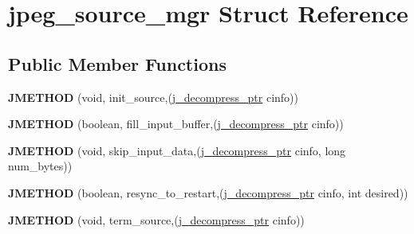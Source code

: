 \hypertarget{structjpeg__source__mgr}{\section{jpeg\+\_\+source\+\_\+mgr Struct Reference}
\label{structjpeg__source__mgr}
}
\subsection*{Public Member Functions}
\begin{DoxyCompactItemize}
\item 
\hypertarget{structjpeg__source__mgr_af8fda02c19c9dc4e505daabb77c3ad81}{{\bfseries J\+M\+E\+T\+H\+O\+D} (void, init\+\_\+source,(\hyperlink{structjpeg__decompress__struct}{j\+\_\+decompress\+\_\+ptr} cinfo))}\label{structjpeg__source__mgr_af8fda02c19c9dc4e505daabb77c3ad81}

\item 
\hypertarget{structjpeg__source__mgr_ab4a579b1f50108e2de73c7c0c1bbb9fd}{{\bfseries J\+M\+E\+T\+H\+O\+D} (boolean, fill\+\_\+input\+\_\+buffer,(\hyperlink{structjpeg__decompress__struct}{j\+\_\+decompress\+\_\+ptr} cinfo))}\label{structjpeg__source__mgr_ab4a579b1f50108e2de73c7c0c1bbb9fd}

\item 
\hypertarget{structjpeg__source__mgr_a3e29df8ddadb0c15e54b69b5a7a10305}{{\bfseries J\+M\+E\+T\+H\+O\+D} (void, skip\+\_\+input\+\_\+data,(\hyperlink{structjpeg__decompress__struct}{j\+\_\+decompress\+\_\+ptr} cinfo, long num\+\_\+bytes))}\label{structjpeg__source__mgr_a3e29df8ddadb0c15e54b69b5a7a10305}

\item 
\hypertarget{structjpeg__source__mgr_a60a35ccd1fb8d954f34c0cdbf29ac010}{{\bfseries J\+M\+E\+T\+H\+O\+D} (boolean, resync\+\_\+to\+\_\+restart,(\hyperlink{structjpeg__decompress__struct}{j\+\_\+decompress\+\_\+ptr} cinfo, int desired))}\label{structjpeg__source__mgr_a60a35ccd1fb8d954f34c0cdbf29ac010}

\item 
\hypertarget{structjpeg__source__mgr_a6c0683ce1166b9ee659b2d3aa1efb1c2}{{\bfseries J\+M\+E\+T\+H\+O\+D} (void, term\+\_\+source,(\hyperlink{structjpeg__decompress__struct}{j\+\_\+decompress\+\_\+ptr} cinfo))}\label{structjpeg__source__mgr_a6c0683ce1166b9ee659b2d3aa1efb1c2}

\end{DoxyCompactItemize}
